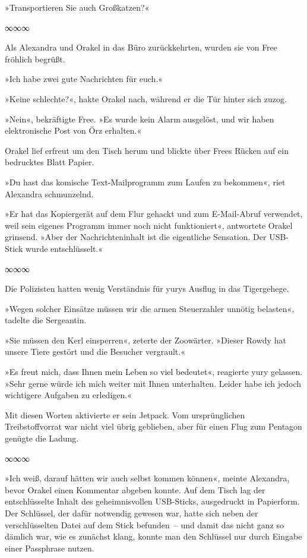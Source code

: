 »Transportieren Sie auch Großkatzen?«

\begin{center}
∞∞∞
\end{center}

Als Alexandra und Orakel in das Büro zurückkehrten, wurden sie von Free fröhlich begrüßt.

»Ich habe zwei gute Nachrichten für euch.«

»Keine schlechte?«, hakte Orakel nach, während er die Tür hinter sich zuzog.

»Nein«, bekräftigte Free. »Es wurde kein Alarm ausgelöst, und wir haben elektronische Post von Örz erhalten.«

Orakel lief erfreut um den Tisch herum und blickte über Frees Rücken auf ein bedrucktes Blatt Papier.

»Du hast das komische Text-Mailprogramm zum Laufen zu bekommen«, riet Alexandra schmunzelnd.

»Er hat das Kopiergerät auf dem Flur gehackt und zum E-Mail-Abruf verwendet, weil sein eigenes Programm immer noch nicht funktioniert«, antwortete Orakel grinsend. »Aber der Nachrichteninhalt ist die eigentliche Sensation. Der USB-Stick wurde entschlüsselt.«

\begin{center}
∞∞∞
\end{center}

Die Polizisten hatten wenig Verständnis für yurys Ausflug in das Tigergehege.

»Wegen solcher Einsätze müssen wir die armen Steuerzahler unnötig belasten«, tadelte die Sergeantin.

»Sie müssen den Kerl einsperren«, zeterte der Zoowärter. »Dieser Rowdy hat unsere Tiere gestört und die Besucher vergrault.«

»Es freut mich, dass Ihnen mein Leben so viel bedeutet«, reagierte yury gelassen. »Sehr gerne würde ich mich weiter mit Ihnen unterhalten. Leider habe ich jedoch wichtigere Aufgaben zu erledigen.«

Mit diesen Worten aktivierte er sein Jetpack. Vom ursprünglichen Treibstoffvorrat war nicht viel übrig geblieben, aber für einen Flug zum Pentagon genügte die Ladung.

\begin{center}
∞∞∞
\end{center}

»Ich weiß, darauf hätten wir auch selbst kommen können«, meinte Alexandra, bevor Orakel einen Kommentar abgeben konnte. Auf dem Tisch lag der entschlüsselte Inhalt des geheimnisvollen USB-Sticks, ausgedruckt in Papierform. Der Schlüssel, der dafür notwendig gewesen war, hatte sich neben der verschlüsselten Datei auf dem Stick befunden~– und damit das nicht ganz so dämlich war, wie es zunächst klang, konnte man den Schlüssel nur durch Eingabe einer Passphrase nutzen.

